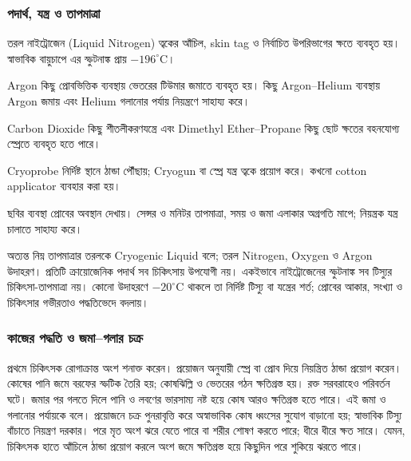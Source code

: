 \subsubsection{পদার্থ, যন্ত্র ও তাপমাত্রা}
\begin{compactpoints}
\item তরল নাইট্রোজেন (Liquid Nitrogen) ত্বকের আঁচিল, skin tag ও নির্বাচিত উপরিভাগের ক্ষতে ব্যবহৃত হয়। স্বাভাবিক বায়ুচাপে এর স্ফুটনাঙ্ক প্রায় $-196^\circ\mathrm C$।
\item Argon কিছু প্রোবভিত্তিক ব্যবস্থায় ভেতরের টিউমার জমাতে ব্যবহৃত হয়। কিছু Argon--Helium ব্যবস্থায় Argon জমায় এবং Helium গলানোর পর্যায় নিয়ন্ত্রণে সাহায্য করে।
\item Carbon Dioxide কিছু শীতলীকরণযন্ত্রে এবং Dimethyl Ether--Propane কিছু ছোট ক্ষতের বহনযোগ্য স্প্রেতে ব্যবহৃত হতে পারে।
\item Cryoprobe নির্দিষ্ট স্থানে ঠান্ডা পৌঁছায়; Cryogun বা স্প্রে যন্ত্র ত্বকে প্রয়োগ করে। কখনো cotton applicator ব্যবহার করা হয়।
\item ছবির ব্যবস্থা প্রোবের অবস্থান দেখায়। সেন্সর ও মনিটর তাপমাত্রা, সময় ও জমা এলাকার অগ্রগতি মাপে; নিয়ন্ত্রক যন্ত্র চালাতে সাহায্য করে।
\end{compactpoints}
অত্যন্ত নিম্ন তাপমাত্রার তরলকে Cryogenic Liquid বলে; তরল Nitrogen, Oxygen ও Argon উদাহরণ। প্রতিটি ক্রায়োজেনিক পদার্থ সব চিকিৎসায় উপযোগী নয়। একইভাবে নাইট্রোজেনের স্ফুটনাঙ্ক সব টিস্যুর চিকিৎসা-তাপমাত্রা নয়। কোনো উদাহরণে $-20^\circ\mathrm C$ থাকলে তা নির্দিষ্ট টিস্যু বা যন্ত্রের শর্ত; প্রোবের আকার, সংখ্যা ও চিকিৎসার গভীরতাও পদ্ধতিভেদে বদলায়।
\subsubsection{কাজের পদ্ধতি ও জমা--গলার চক্র}
প্রথমে চিকিৎসক রোগাক্রান্ত অংশ শনাক্ত করেন। প্রয়োজন অনুযায়ী স্প্রে বা প্রোব দিয়ে নিয়ন্ত্রিত ঠান্ডা প্রয়োগ করেন। কোষের পানি জমে বরফের স্ফটিক তৈরি হয়; কোষঝিল্লি ও ভেতরের গঠন ক্ষতিগ্রস্ত হয়। রক্ত সরবরাহেও পরিবর্তন ঘটে। জমার পর গলতে দিলে পানি ও লবণের ভারসাম্য নষ্ট হয়ে কোষ আরও ক্ষতিগ্রস্ত হতে পারে।
এই জমা ও গলানোর পর্যায়কে  বলে। প্রয়োজনে চক্র পুনরাবৃত্তি করে অস্বাভাবিক কোষ ধ্বংসের সুযোগ বাড়ানো হয়; স্বাভাবিক টিস্যু বাঁচাতে নিয়ন্ত্রণ দরকার। পরে মৃত অংশ ঝরে যেতে পারে বা শরীর শোষণ করতে পারে; ধীরে ধীরে ক্ষত সারে। যেমন, চিকিৎসক হাতে আঁচিলে ঠান্ডা প্রয়োগ করলে অংশ জমে ক্ষতিগ্রস্ত হয়ে কিছুদিন পরে শুকিয়ে ঝরতে পারে।
\label{fig:cryosurgery-overview}
